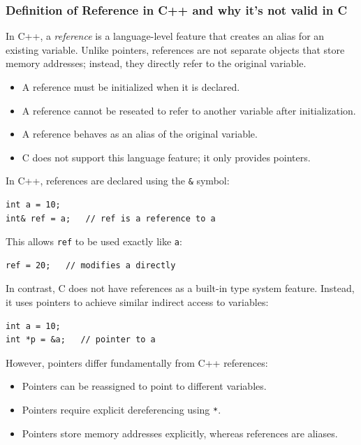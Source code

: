 \documentclass[10pt]{article}
\begin{document}
\newpage
\subsubsection{Definition of Reference in C++ and why it's not valid in C}

In C++, a \textit{reference} is a language-level feature that creates an alias for an existing variable. Unlike pointers, references are not separate objects that store memory addresses; instead, they directly refer to the original variable.

\begin{itemize}
    \item A reference must be initialized when it is declared.
    \item A reference cannot be reseated to refer to another variable after initialization.
    \item A reference behaves as an alias of the original variable.
    \item C does not support this language feature; it only provides pointers.
\end{itemize}

In C++, references are declared using the \texttt{\&} symbol:

\begin{verbatim}
int a = 10;
int& ref = a;   // ref is a reference to a
\end{verbatim}

This allows \texttt{ref} to be used exactly like \texttt{a}:

\begin{verbatim}
ref = 20;   // modifies a directly
\end{verbatim}

In contrast, C does not have references as a built-in type system feature. Instead, it uses pointers to achieve similar indirect access to variables:

\begin{verbatim}
int a = 10;
int *p = &a;   // pointer to a
\end{verbatim}

However, pointers differ fundamentally from C++ references:

\begin{itemize}
    \item Pointers can be reassigned to point to different variables.
    \item Pointers require explicit dereferencing using \texttt{*}.
    \item Pointers store memory addresses explicitly, whereas references are aliases.
\end{itemize}
\end{document}
